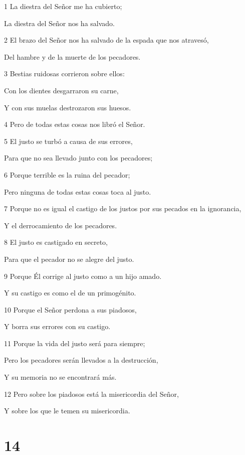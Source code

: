 \par 1 La diestra del Señor me ha cubierto;
\par     La diestra del Señor nos ha salvado.
\par 2 El brazo del Señor nos ha salvado de la espada que nos atravesó,
\par     Del hambre y de la muerte de los pecadores.
\par 3 Bestias ruidosas corrieron sobre ellos:
\par     Con los dientes desgarraron su carne,
\par     Y con sus muelas destrozaron sus huesos.
\par 4 Pero de todas estas cosas nos libró el Señor.
\par 5 El justo se turbó a causa de sus errores,
\par     Para que no sea llevado junto con los pecadores;
\par 6 Porque terrible es la ruina del pecador;
\par     Pero ninguna de todas estas cosas toca al justo.
\par 7 Porque no es igual el castigo de los justos por sus pecados en la ignorancia,
\par     Y el derrocamiento de los pecadores.
\par 8 El justo es castigado en secreto,
\par     Para que el pecador no se alegre del justo.
\par 9 Porque Él corrige al justo como a un hijo amado.
\par     Y su castigo es como el de un primogénito.
\par 10 Porque el Señor perdona a sus piadosos,
\par     Y borra sus errores con su castigo.
\par 11 Porque la vida del justo será para siempre;
\par     Pero los pecadores serán llevados a la destrucción,
\par     Y su memoria no se encontrará más.
\par 12 Pero sobre los piadosos está la misericordia del Señor,
\par     Y sobre los que le temen su misericordia.



\chapter{14}

